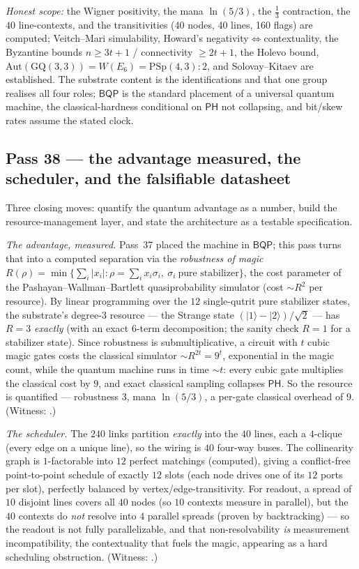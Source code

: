 \documentclass[11pt]{article}
\begin{document}
\emph{Honest scope:} the Wigner positivity, the mana $\ln(5/3)$, the $\tfrac13$ contraction, the $40$
line-contexts, and the transitivities (40 nodes, 40 lines, 160 flags) are computed; Veitch--Mari
simulability, Howard's negativity$\Leftrightarrow$contextuality, the Byzantine bounds $n\ge3t+1$ /
connectivity $\ge2t+1$, the Holevo bound, $\mathrm{Aut}(\mathrm{GQ}(3,3))=W(E_6)=\mathrm{PSp}(4,3){:}2$,
and Solovay--Kitaev are established. The substrate content is the identifications and that one group
realises all four roles; $\mathsf{BQP}$ is the standard placement of a universal quantum machine, the
classical-hardness conditional on $\mathsf{PH}$ not collapsing, and bit/skew rates assume the stated
clock.

\subsection{Pass 38 --- the advantage measured, the scheduler, and the falsifiable datasheet}
\label{sec:capstone-thirtyeight}

Three closing moves: quantify the quantum advantage as a number, build the resource-management layer,
and state the architecture as a testable specification.

\emph{The advantage, measured.} Pass~37 placed the machine in $\mathsf{BQP}$; this pass turns that
into a computed separation via the \emph{robustness of magic} $R(\rho)=\min\{\sum_i|x_i|:\rho=\sum_i
x_i\sigma_i,\ \sigma_i\ \text{pure stabilizer}\}$, the cost parameter of the Pashayan--Wallman--Bartlett
quasiprobability simulator (cost $\sim R^2$ per resource). By linear programming over the $12$
single-qutrit pure stabilizer states, the substrate's degree-$3$ resource --- the Strange state
$(|1\rangle-|2\rangle)/\sqrt2$ --- has $R=3$ \emph{exactly} (with an exact $6$-term decomposition; the
sanity check $R=1$ for a stabilizer state). Since robustness is submultiplicative, a circuit with $t$
cubic magic gates costs the classical simulator $\sim R^{2t}=9^t$, exponential in the magic count,
while the quantum machine runs in time $\sim t$: every cubic gate multiplies the classical cost by
$9$, and exact classical sampling collapses $\mathsf{PH}$. So the resource is quantified --- robustness
$3$, mana $\ln(5/3)$, a per-gate classical overhead of $9$. (Witness:
.)

\emph{The scheduler.} The $240$ links partition \emph{exactly} into the $40$ lines, each a $4$-clique
(every edge on a unique line), so the wiring is $40$ four-way buses. The collinearity graph is
$1$-factorable into $12$ perfect matchings (computed), giving a conflict-free point-to-point schedule
of exactly $12$ slots (each node drives one of its $12$ ports per slot), perfectly balanced by
vertex/edge-transitivity. For readout, a spread of $10$ disjoint lines covers all $40$ nodes (so $10$
contexts measure in parallel), but the $40$ contexts do \emph{not} resolve into $4$ parallel spreads
(proven by backtracking) --- so the readout is not fully parallelizable, and that non-resolvability
\emph{is} measurement incompatibility, the contextuality that fuels the magic, appearing as a hard
scheduling obstruction. (Witness: .)
\end{document}

